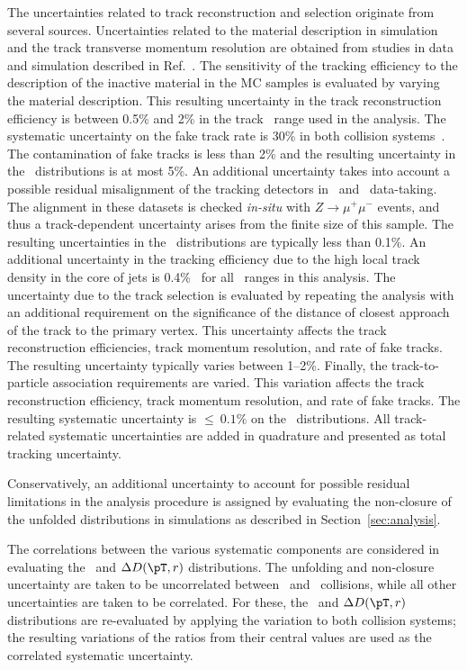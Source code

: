 The uncertainties related to track reconstruction and selection originate from several sources.
Uncertainties related to the material description in simulation and the track transverse 
momentum resolution are obtained from studies in data and simulation described in Ref.~\cite{ATL-PHYS-PUB-2015-051}.
The sensitivity of the tracking efficiency to the description of the 
inactive material in the MC samples is evaluated by varying the material description.
This resulting uncertainty in the track reconstruction efficiency is between
0.5\% and 2\% in the track \pT\ range used in the analysis. 
The systematic uncertainty on the fake track rate is 30\% in both collision systems~\cite{ATL-PHYS-PUB-2015-051}.  The contamination of fake tracks is less than 2\% and the resulting uncertainty in the \Dptr\ distributions is at most 5\%.
An additional uncertainty takes into account a possible residual misalignment of the tracking detectors
in \pp\ and \PbPb\ data-taking. The alignment in these datasets is checked \textit{in-situ} with $Z\rightarrow \mu^{+}\mu^{-}$ events, and thus a track-\pT\-dependent uncertainty arises from the finite size of this sample. The resulting uncertainties in
the \Dptr\ distributions are typically less than 0.1\%. An additional  uncertainty in the tracking efficiency due to the high local track density in the core of jets is 0.4\%~\cite{ATL-PHYS-PUB-2016-007} for all \ptjet\ ranges in this analysis. The uncertainty due to the track selection is evaluated by repeating the analysis with an additional requirement on the significance of the distance of closest approach of the track to the primary vertex. This uncertainty affects 
the track reconstruction efficiencies, track momentum resolution, and rate of fake tracks. The resulting uncertainty typically varies between 1--2\%.
Finally, the track-to-particle association requirements are varied. This variation affects the track reconstruction efficiency, track momentum resolution, and rate of fake tracks. The resulting systematic uncertainty is $\leq~0.1 \%$ on the \Dptr\ distributions. All track-related systematic uncertainties are added in quadrature and presented as total tracking uncertainty. 

Conservatively, an additional uncertainty to account for possible residual limitations in the analysis procedure is assigned by evaluating the non-closure of the unfolded distributions in simulations as described in Section~\ref{sec:analysis}.

The correlations between the various systematic components are considered in evaluating the \RDptr\ and $\Delta\Dptr$ distributions. The unfolding and non-closure uncertainty are taken to be uncorrelated between \pp\ and \pbpb\ collisions, while all other uncertainties are taken to be correlated. For these, the \RDptr\ and $\Delta\Dptr$ distributions are re-evaluated by applying the variation to both collision systems; the resulting variations of the ratios from their central values are used as the correlated systematic uncertainty. 

